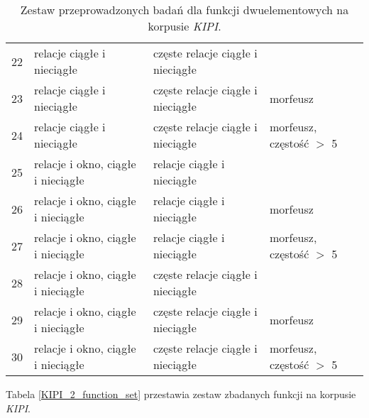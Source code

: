 \begin{table}[h!]
\begin{tabular}{ l || l | l | l }
	22	& relacje ciągłe i nieciągłe			& częste relacje ciągłe i nieciągłe	& 							\\
	23	& relacje ciągłe i nieciągłe			& częste relacje ciągłe i nieciągłe	& morfeusz					\\
	24	& relacje ciągłe i nieciągłe			& częste relacje ciągłe i nieciągłe	& morfeusz, częstość $>$ 5	\\
	25	& relacje i okno, ciągłe i nieciągłe	& relacje ciągłe i nieciągłe		&							\\
	26	& relacje i okno, ciągłe i nieciągłe	& relacje ciągłe i nieciągłe		& morfeusz					\\
	27	& relacje i okno, ciągłe i nieciągłe	& relacje ciągłe i nieciągłe		& morfeusz, częstość $>$ 5	\\
	28	& relacje i okno, ciągłe i nieciągłe	& częste relacje ciągłe i nieciągłe	&							\\
	29	& relacje i okno, ciągłe i nieciągłe	& częste relacje ciągłe	i nieciągłe	& morfeusz					\\
	30	& relacje i okno, ciągłe i nieciągłe	& częste relacje ciągłe	i nieciągłe	& morfeusz, częstość $>$ 5	\\
	\bottomrule
\end{tabular}
\caption[Zestaw przeprowadzonych badań dla funkcji dwuelementowych na korpusie \emph{KIPI}]{Zestaw przeprowadzonych badań dla funkcji dwuelementowych na korpusie \emph{KIPI}.}
\label{KIPI_2_research_types}
\end{table}

Tabela \ref{KIPI_2_function_set} przestawia zestaw zbadanych funkcji na korpusie \emph{KIPI}.

